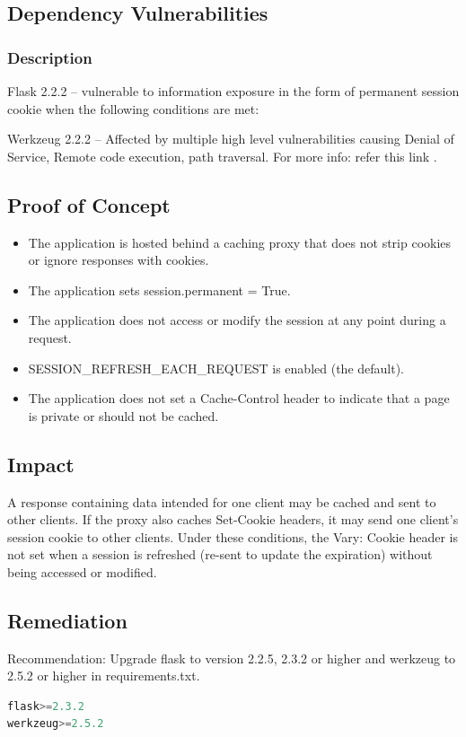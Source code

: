 \documentclass[11pt,a4paper]{article}
\newenvironment{vulnerability}[3]{%
    \begin{tcolorbox}[
        colback=white,
        colframe=#1,
        fonttitle=\bfseries\color{white},
        coltitle=#1,
        title=#2: #3
    ]
}{%
    \end{tcolorbox}
}
\begin{document}
\subsection{Dependency Vulnerabilities}

\begin{vulnerability}{codeboring}{Medium}{Dependencies Vulnerabilities}
\subsubsection*{Description}
Flask 2.2.2 – vulnerable to information exposure in the form of permanent session cookie when the following conditions are met:

Werkzeug 2.2.2 – Affected by multiple high level vulnerabilities causing Denial of Service, Remote code execution, path traversal. For more info: refer this link .
\\
\subsection*{Proof of Concept}
\begin{itemize}
    \item The application is hosted behind a caching proxy that does not strip cookies or ignore responses with cookies.
\item The application sets session.permanent = True.
\item The application does not access or modify the session at any point during a request.
\item SESSION\_REFRESH\_EACH\_REQUEST is enabled (the default).
\item The application does not set a Cache-Control header to indicate that a page is private or should not be cached.
\end{itemize}
\subsection*{Impact}
A response containing data intended for one client may be cached and sent to other clients. If the proxy also caches Set-Cookie headers, it may send one client's session cookie to other clients. Under these conditions, the Vary: Cookie header is not set when a session is refreshed (re-sent to update the expiration) without being accessed or modified.
\subsection*{Remediation}
Recommendation: Upgrade flask to version 2.2.5, 2.3.2 or higher and werkzeug to 2.5.2 or higher in requirements.txt.
\begin{lstlisting}[language=Python]
flask>=2.3.2
werkzeug>=2.5.2
\end{lstlisting}
\end{vulnerability}
\end{document}
